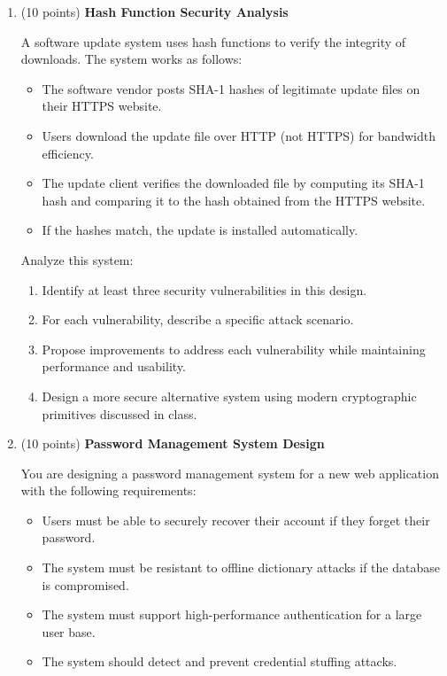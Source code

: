 \documentclass[10pt,a4paper,american]{exam}
\begin{document}
\begin{enumerate}
	\item (10 points) \textbf{Hash Function Security Analysis}

	      A software update system uses hash functions to verify the integrity of downloads. The system works as follows:
	      \begin{itemize}
		      \item The software vendor posts SHA-1 hashes of legitimate update files on their HTTPS website.
		      \item Users download the update file over HTTP (not HTTPS) for bandwidth efficiency.
		      \item The update client verifies the downloaded file by computing its SHA-1 hash and comparing it to the hash obtained from the HTTPS website.
		      \item If the hashes match, the update is installed automatically.
	      \end{itemize}

	      Analyze this system:
	      \begin{enumerate}
		      \item Identify at least three security vulnerabilities in this design.
		      \item For each vulnerability, describe a specific attack scenario.
		      \item Propose improvements to address each vulnerability while maintaining performance and usability.
		      \item Design a more secure alternative system using modern cryptographic primitives discussed in class.
	      \end{enumerate}

	\item (10 points) \textbf{Password Management System Design}

	      You are designing a password management system for a new web application with the following requirements:
	      \begin{itemize}
		      \item Users must be able to securely recover their account if they forget their password.
		      \item The system must be resistant to offline dictionary attacks if the database is compromised.
		      \item The system must support high-performance authentication for a large user base.
		      \item The system should detect and prevent credential stuffing attacks.
	      \end{itemize}


\end{enumerate}
\end{document}
